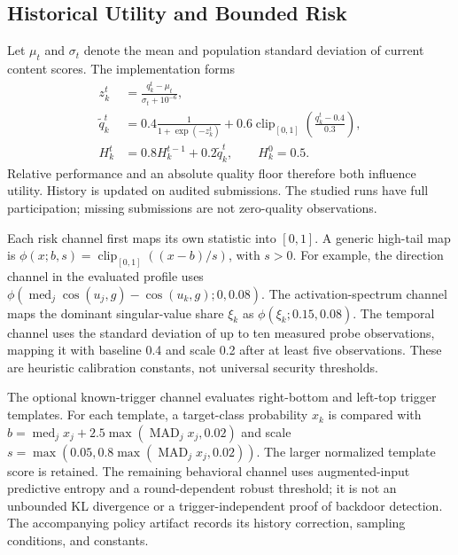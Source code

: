 \documentclass[conference,compsoc]{IEEEtran}
\newcommand{\clip}{\operatorname{clip}_{[0,1]}}
\newcommand{\med}{\operatorname{med}}
\newcommand{\mad}{\operatorname{MAD}}
\begin{document}
\subsection{Historical Utility and Bounded Risk}
Let $\mu_t$ and $\sigma_t$ denote the mean and population standard deviation of current content scores. The implementation forms
\begin{align}
 z_k^t &= \frac{q_k^t-\mu_t}{\sigma_t+10^{-6}},\\
 \widetilde q_k^t &=0.4\frac{1}{1+\exp(-z_k^t)}
       +0.6\clip\!\left(\frac{q_k^t-0.4}{0.3}\right),\\
 H_k^t &=0.8H_k^{t-1}+0.2\widetilde q_k^t,\qquad H_k^0=0.5.
\end{align}
Relative performance and an absolute quality floor therefore both influence utility. History is updated on audited submissions. The studied runs have full participation; missing submissions are not zero-quality observations.

Each risk channel first maps its own statistic into $[0,1]$. A generic high-tail map is $\phi(x;b,s)=\clip((x-b)/s)$, with $s>0$. For example, the direction channel in the evaluated profile uses $\phi(\med_j\cos(u_j,g)-\cos(u_k,g);0,0.08)$. The activation-spectrum channel maps the dominant singular-value share $\xi_k$ as $\phi(\xi_k;0.15,0.08)$. The temporal channel uses the standard deviation of up to ten measured probe observations, mapping it with baseline 0.4 and scale 0.2 after at least five observations. These are heuristic calibration constants, not universal security thresholds.

The optional known-trigger channel evaluates right-bottom and left-top trigger templates. For each template, a target-class probability $x_k$ is compared with $b=\med_j x_j+2.5\max(\mad_j x_j,0.02)$ and scale $s=\max(0.05,0.8\max(\mad_j x_j,0.02))$. The larger normalized template score is retained. The remaining behavioral channel uses augmented-input predictive entropy and a round-dependent robust threshold; it is not an unbounded KL divergence or a trigger-independent proof of backdoor detection. The accompanying policy artifact records its history correction, sampling conditions, and constants.
\end{document}
